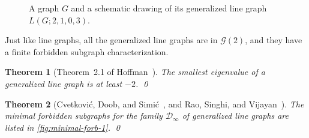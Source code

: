 \documentclass[11pt]{article}
\newtheorem{theorem}{Theorem}[section]
\theoremstyle{definition}
\theoremstyle{remark}
\newcommand{\D}{\mathcal{D}}
\newcommand{\G}{\mathcal{G}}
\begin{document}
\begin{figure}[t]
    \caption{A graph $G$ and a schematic drawing of its generalized line graph $L(G; 2, 1, 0, 3)$.} \label{fig:generalized-line-graph}
\end{figure}

Just like line graphs, all the generalized line graphs are in $\G(2)$, and they have a finite forbidden subgraph characterization.

\begin{theorem}[Theorem~2.1 of Hoffman~\cite{H77b}] \label{thm:generalized-line-smallest-ev}
    The smallest eigenvalue of a generalized line graph is at least $-2$. \qed
\end{theorem}

\begin{theorem}[Cvetkovi\'{c}, Doob, and Simi\'{c}~\cite{CDS80,CDS81}, and Rao, Singhi, and Vijayan~\cite{RSV81}] \label{thm:forb-char-generalized-line}
    The minimal forbidden subgraphs for the family $\D_\infty$ of generalized line graphs are listed in \cref{fig:minimal-forb-1}. \qed
\end{theorem}
\end{document}
